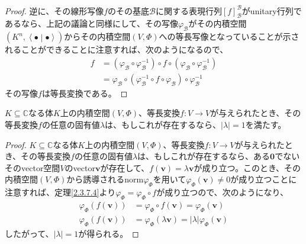 \documentclass[dvipdfmx]{jsarticle}
\begin{document}
\begin{proof}
逆に、その線形写像$f$のその基底$\mathcal{B}$に関する表現行列$[ f]_{\mathcal{B}}^{\mathcal{B}}$がunitary行列であるなら、上記の議論と同様にして、その写像$\varphi_{\mathcal{B}}$がその内積空間$\left( K^{n},\left\langle \bullet \middle| \bullet \right\rangle \right)$からその内積空間$(V,\varPhi)$への等長写像となっていることが示されることができることに注意すれば、次のようになるので、
\begin{align*}
f &= \left( \varphi_{\mathcal{B}} \circ \varphi_{\mathcal{B}}^{- 1} \right) \circ f \circ \left( \varphi_{\mathcal{B}} \circ \varphi_{\mathcal{B}}^{- 1} \right)\\
&= \varphi_{\mathcal{B}} \circ \left( \varphi_{\mathcal{B}}^{- 1} \circ f \circ \varphi_{\mathcal{B}} \right) \circ \varphi_{\mathcal{B}}^{- 1}
\end{align*}
その写像$f$は等長変換である。
\end{proof}
\begin{thm}\label{2.3.8.3}
$K \subseteq \mathbb{C}$なる体$K$上の内積空間$(V,\varPhi)$、等長変換$f:V \rightarrow V$が与えられたとき、その等長変換$f$の任意の固有値$\lambda$は、もしこれが存在するなら、$|\lambda| = 1$を満たす。
\end{thm}
\begin{proof}
$K \subseteq \mathbb{C}$なる体$K$上の内積空間$(V,\varPhi)$、等長変換$f:V \rightarrow V$が与えられたとき、その等長変換$f$の任意の固有値$\lambda$は、もしこれが存在するなら、ある$\mathbf{0}$でないそのvector空間$V$のvector$\mathbf{v}$が存在して、$f\left( \mathbf{v} \right) = \lambda\mathbf{v}$が成り立つ。このとき、その内積空間$(V,\varPhi)$から誘導されるnorm$\varphi_{\varPhi}$を用いて$\varphi_{\varPhi}\left( \mathbf{v} \right) \neq 0$が成り立つことに注意すれば、定理\ref{2.3.7.4}より$\varphi_{\varPhi} = \varphi_{\varPhi} \circ f$が成り立つので、次のようになり、
\begin{align*}
\varphi_{\varPhi}\left( f\left( \mathbf{v} \right) \right) &= \varphi_{\varPhi} \circ f\left( \mathbf{v} \right) = \varphi_{\varPhi}\left( \mathbf{v} \right)\\
\varphi_{\varPhi}\left( f\left( \mathbf{v} \right) \right) &= \varphi_{\varPhi}\left( \lambda\mathbf{v} \right) = |\lambda|\varphi_{\varPhi}\left( \mathbf{v} \right)
\end{align*}
したがって、$|\lambda| = 1$が得られる。
\end{proof}
\end{document}
